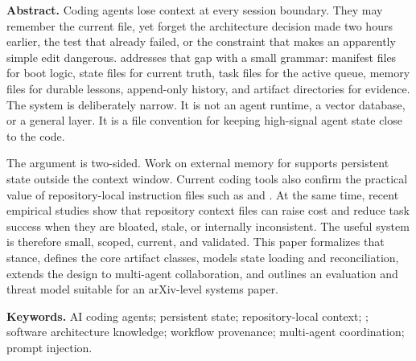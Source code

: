 
\begin{calloutbox}[colframe=BitTeal!60!BitNavy]
\textbf{Abstract.} Coding agents lose context at every session boundary. They may remember the current file, yet forget the architecture decision made two hours earlier, the test that already failed, or the constraint that makes an apparently simple edit dangerous. \systemname{} addresses that gap with a small \repo{} \stateascode{} grammar: manifest files for boot logic, state files for current truth, task files for the active queue, memory files for durable lessons, append-only history, and artifact directories for evidence. The system is deliberately narrow. It is not an agent runtime, a vector database, or a general \RAG{} layer. It is a file convention for keeping high-signal agent state close to the code.

The argument is two-sided. Work on external memory for \LLMs{} supports persistent state outside the context window. Current coding tools also confirm the practical value of repository-local instruction files such as  and . At the same time, recent empirical studies show that repository context files can raise cost and reduce task success when they are bloated, stale, or internally inconsistent. The useful system is therefore small, scoped, current, and validated. This paper formalizes that stance, defines the core artifact classes, models state loading and reconciliation, extends the design to multi-agent collaboration, and outlines an evaluation and threat model suitable for an arXiv-level systems paper.
\end{calloutbox}

\begin{calloutbox}[colback=white,colframe=BitLine,boxrule=0.4pt]
\textbf{Keywords.} AI coding agents; persistent state; repository-local context; ; software architecture knowledge; workflow provenance; multi-agent coordination; prompt injection.
\end{calloutbox}

